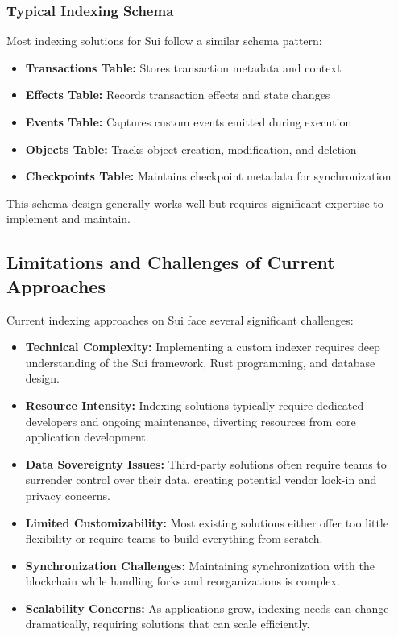 \subsubsection{Typical Indexing Schema}

Most indexing solutions for Sui follow a similar schema pattern:

\begin{itemize}
    \item \textbf{Transactions Table:} Stores transaction metadata and context
    \item \textbf{Effects Table:} Records transaction effects and state changes
    \item \textbf{Events Table:} Captures custom events emitted during execution
    \item \textbf{Objects Table:} Tracks object creation, modification, and deletion
    \item \textbf{Checkpoints Table:} Maintains checkpoint metadata for synchronization
\end{itemize}

This schema design generally works well but requires significant expertise to implement and maintain.

\subsection{Limitations and Challenges of Current Approaches}

Current indexing approaches on Sui face several significant challenges:

\begin{itemize}
    \item \textbf{Technical Complexity:} Implementing a custom indexer requires deep understanding of the Sui framework, Rust programming, and database design.
    
    \item \textbf{Resource Intensity:} Indexing solutions typically require dedicated developers and ongoing maintenance, diverting resources from core application development.
    
    \item \textbf{Data Sovereignty Issues:} Third-party solutions often require teams to surrender control over their data, creating potential vendor lock-in and privacy concerns.
    
    \item \textbf{Limited Customizability:} Most existing solutions either offer too little flexibility or require teams to build everything from scratch.
    
    \item \textbf{Synchronization Challenges:} Maintaining synchronization with the blockchain while handling forks and reorganizations is complex.
    
    \item \textbf{Scalability Concerns:} As applications grow, indexing needs can change dramatically, requiring solutions that can scale efficiently.
\end{itemize}


